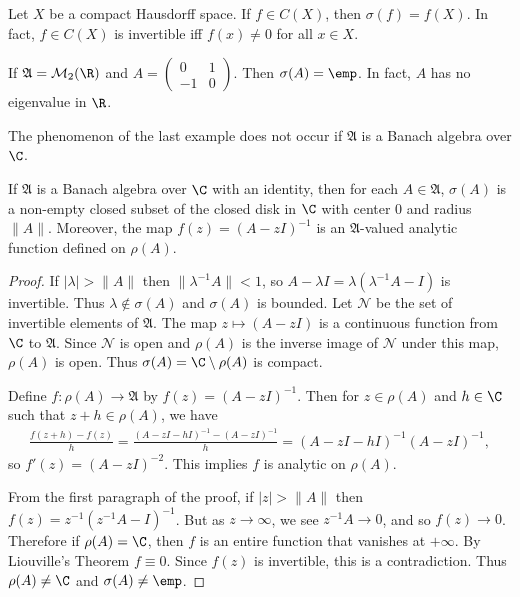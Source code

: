 \begin{example}\label{spectrum in C(X)}
Let $X$ be a compact Hausdorff space. If $f\in C(X)$, then $\sigma(f)=f(X)$. In fact, $f\in C(X)$ is invertible iff $f(x)\neq 0$ for all $x\in X$. 
\end{example}
\begin{example}
If $\mathfrak{A}=\mathcal{M}_2(\R)$ and $A=(\begin{smallmatrix}0&1\\-1&0\end{smallmatrix})$. Then $\sigma(A)=\emp$. In fact, $A$ has no eigenvalue in $\R$.
\end{example}
The phenomenon of the last example does not occur if $\mathfrak{A}$ is a Banach algebra over $\C$.
\begin{theorem}\label{Banach algebra complex spectrum nonempty}
If $\mathfrak{A}$ is a Banach algebra over $\C$ with an identity, then for each $A\in\mathfrak{A}$, $\sigma(A)$ is a non-empty closed subset of the closed disk in $\C$ with center $0$ and radius $\|A\|$. Moreover, the map $f(z)=(A-zI)^{-1}$ is an $\mathfrak{A}$-valued analytic function defined on $\rho(A)$.
\end{theorem}
\begin{proof}
If $|\lambda|>\|A\|$ then $\|\lambda^{-1}A\|<1$, so $A-\lambda I=\lambda(\lambda^{-1}A-I)$ is invertible. Thus $\lambda\notin\sigma(A)$ and $\sigma(A)$ is bounded. Let $\mathscr{N}$ be the set of invertible elements of $\mathfrak{A}$. The map $z\mapsto(A-zI)$ is a continuous function from $\C$ to $\mathfrak{A}$. Since $\mathscr{N}$ is open and $\rho(A)$ is the inverse image of $\mathscr{N}$ under this map, $\rho(A)$ is open. Thus $\sigma(A)=\C\setminus\rho(A)$ is compact.\par
Define $f:\rho(A)\to\mathfrak{A}$ by $f(z)=(A-zI)^{-1}$. Then for $z\in\rho(A)$ and $h\in\C$ such that $z+h\in\rho(A)$, we have
\begin{align*}
\frac{f(z+h)-f(z)}{h}=\frac{(A-zI-hI)^{-1}-(A-zI)^{-1}}{h}=(A-zI-hI)^{-1}(A-zI)^{-1},
\end{align*}
so $f'(z)=(A-zI)^{-2}$. This implies $f$ is analytic on $\rho(A)$.\par
From the first paragraph of the proof, if $|z|>\|A\|$ then $f(z)=z^{-1}(z^{-1}A-I)^{-1}$. But as $z\to\infty$, we see $z^{-1}A\to 0$, and so $f(z)\to 0$. Therefore if $\rho(A)=\C$, then $f$ is an entire function that vanishes at $+\infty$. By Liouville's Theorem $f\equiv 0$. Since $f(z)$ is invertible, this is a contradiction. Thus $\rho(A)\neq\C$ and $\sigma(A)\neq\emp$.
\end{proof}
